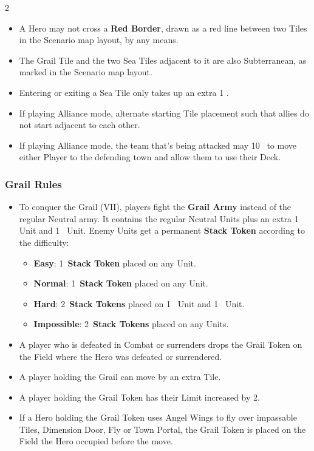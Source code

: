 \begin{multicols}{2}
\begin{itemize}
  \item A Hero may not cross a \textbf{Red Border}, drawn as a red line between two Tiles in the Scenario map layout, by any means.
  \item The Grail Tile and the two Sea Tiles adjacent to it are also Subterranean, as marked in the Scenario map layout.
  \item Entering or exiting a Sea Tile only takes up an extra 1 .
  \item If playing Alliance mode, alternate starting Tile placement such that allies do not start adjacent to each other.
  \item If playing Alliance mode, the team that's being attacked may  10~ to move either Player to the defending town and allow them to use their Deck.
\end{itemize}

\subsubsection*{Grail Rules}

\begin{itemize}
  \item To conquer the Grail (VII), players fight the \textbf{Grail Army} instead of the regular Neutral army.
    It contains the regular Neutral Units plus an extra 1~ Unit and 1~ Unit.
    Enemy Units get a permanent \textbf{Stack Token} according to the difficulty:
    \begin{itemize}
      \item \textbf{Easy}: 1~\textbf{Stack Token} placed on any  Unit.
      \item \textbf{Normal}: 1~\textbf{Stack Token} placed on any  Unit.
      \item \textbf{Hard}: 2~\textbf{Stack Tokens} placed on 1~ Unit and 1~ Unit.
      \item \textbf{Impossible}: 2~\textbf{Stack Tokens} placed on any  Units.
    \end{itemize}
  \item A player who is defeated in Combat or surrenders drops the Grail Token on the Field where the Hero was defeated or surrendered.
  \item A player holding the Grail can move by an extra Tile.
  \item A player holding the Grail Token has their  Limit increased by 2.
  \item If a Hero holding the Grail Token uses Angel Wings to fly over impassable Tiles, Dimension Door, Fly or Town Portal, the Grail Token is placed on the Field the Hero occupied before the move.
\end{itemize}


\end{multicols}
